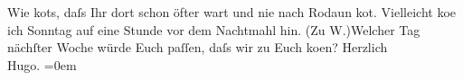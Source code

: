 \begin{ledgroupsized}[t]{13cm}
               Wie ko{\geminationm}ts, daſs Ihr dort schon öfter wart und nie nach
                  Rodaun ko{\geminationm}t.\pend
           \pstart
           Vielleicht ko{\geminationm}e ich Sonntag auf eine Stunde
               vor dem Nachtmahl hin. (Zu W.)\hspace*{1.5em}Welcher Tag nächſter Woche würde Euch paſſen, daſs wir
               zu Euch ko{\geminationm}en?\pend
           \pstart
           Herzlich{\\[\baselineskip]}\spacefill\mbox{Hugo.}\pend
           \leftskip=0em{}
         
         \endnumbering{}\end{ledgroupsized}  \newcommand{\dateiname}{L01501}\newcommand{\titel}{Hugo von Hofmannsthal an Arthur Schnitzler, 16. 2. 1905}\newcommand{\editorInnen}{Martin Anton Müller und Gerd-Hermann Susen}
      